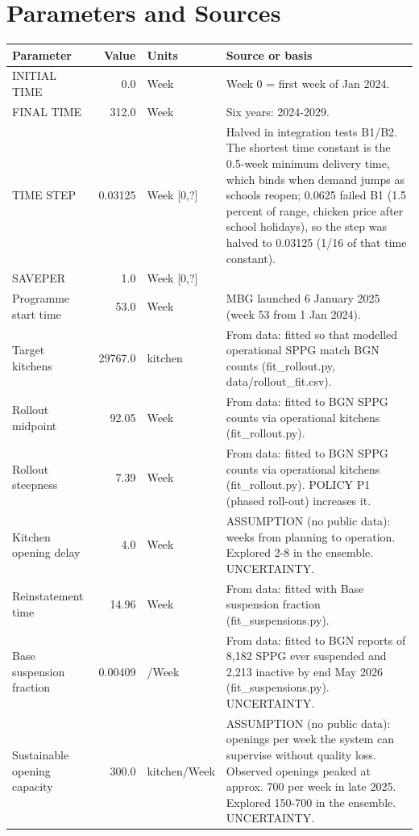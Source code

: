 \documentclass[10pt,twocolumn,a4paper]{article}
\begin{document}
\section{Parameters and Sources}\label{app:par}
\scriptsize
\begin{longtable}{>{\raggedright\arraybackslash}p{4.2cm}r>{\raggedright\arraybackslash}p{2.4cm}>{\raggedright\arraybackslash}p{7.2cm}}
\toprule \textbf{Parameter} & \textbf{Value} & \textbf{Units} & \textbf{Source or basis} \\ \midrule \endhead
INITIAL TIME & 0.0 & Week & Week 0 = first week of Jan 2024. \\
FINAL TIME & 312.0 & Week & Six years: 2024-2029. \\
TIME STEP & 0.03125 & Week [0,?] & Halved in integration tests B1/B2. The shortest time constant is the 0.5-week minimum delivery time, which binds when demand jumps as schools reopen; 0.0625 failed B1 (1.5 percent of range, chicken price after school holidays), so the step was halved to 0.03125 (1/16 of that time constant). \\
SAVEPER & 1.0 & Week [0,?] &  \\
Programme start time & 53.0 & Week & MBG launched 6 January 2025 (week 53 from 1 Jan 2024). \\
Target kitchens & 29767.0 & kitchen & From data: fitted so that modelled operational SPPG match BGN counts (fit\_rollout.py, data/rollout\_fit.csv). \\
Rollout midpoint & 92.05 & Week & From data: fitted to BGN SPPG counts via operational kitchens (fit\_rollout.py). \\
Rollout steepness & 7.39 & Week & From data: fitted to BGN SPPG counts via operational kitchens (fit\_rollout.py). POLICY P1 (phased roll-out) increases it. \\
Kitchen opening delay & 4.0 & Week & ASSUMPTION (no public data): weeks from planning to operation. Explored 2-8 in the ensemble. UNCERTAINTY. \\
Reinstatement time & 14.96 & Week & From data: fitted with Base suspension fraction (fit\_suspensions.py). \\
Base suspension fraction & 0.00409 & 1/Week & From data: fitted to BGN reports of 8,182 SPPG ever suspended and 2,213 inactive by end May 2026 (fit\_suspensions.py). UNCERTAINTY. \\
Sustainable opening capacity & 300.0 & kitchen/Week & ASSUMPTION (no public data): openings per week the system can supervise without quality loss. Observed openings peaked at approx. 700 per week in late 2025. Explored 150-700 in the ensemble. UNCERTAINTY. \\

\end{longtable}
\end{document}
